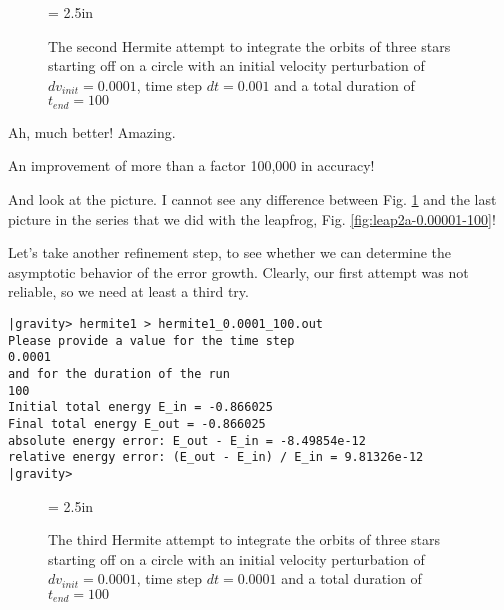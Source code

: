 \begin{figure}[htb]
\begin{center}
\epsfxsize = 2.5in
\caption[Three stars on a circle, Hermite, $dv_{init}=0.0001$, $dt = 0.001$,
$t_{end} = 100$]
{The second Hermite attempt to integrate the orbits of three stars
starting off on a circle with an initial velocity perturbation of 
$dv_{init}=0.0001$, time step $dt = 0.001$ and a total duration of
$t_{end} = 100$}
\label{fig:hermite1-0.001-100}
\end{center}
\end{figure}

\abc

\carol
Ah, much better!  Amazing.

\bob
An improvement of more than a factor 100,000 in accuracy!

\carol
And look at the picture.  I cannot see any difference between Fig. 
\ref{fig:hermite1-0.001-100} and the last picture in the series that
we did with the leapfrog, Fig. \ref{fig:leap2a-0.00001-100}!

\alice
Let's take another refinement step, to see whether we can determine
the asymptotic behavior of the error growth.  Clearly, our first
attempt was not reliable, so we need at least a third try.

\cba

\begin{small}
\begin{verbatim}
|gravity> hermite1 > hermite1_0.0001_100.out
Please provide a value for the time step
0.0001
and for the duration of the run
100
Initial total energy E_in = -0.866025
Final total energy E_out = -0.866025
absolute energy error: E_out - E_in = -8.49854e-12
relative energy error: (E_out - E_in) / E_in = 9.81326e-12
|gravity>
\end{verbatim}
\end{small}

\begin{figure}[htb]
\begin{center}
\epsfxsize = 2.5in
\caption[Three stars on a circle, Hermite, $dv_{init}=0.0001$, $dt = 0.0001$,
$t_{end} = 100$]
{The third Hermite attempt to integrate the orbits of three stars
starting off on a circle with an initial velocity perturbation of 
$dv_{init}=0.0001$, time step $dt = 0.0001$ and a total duration of
$t_{end} = 100$}
\label{fig:hermite1-0.0001-100}
\end{center}
\end{figure}

